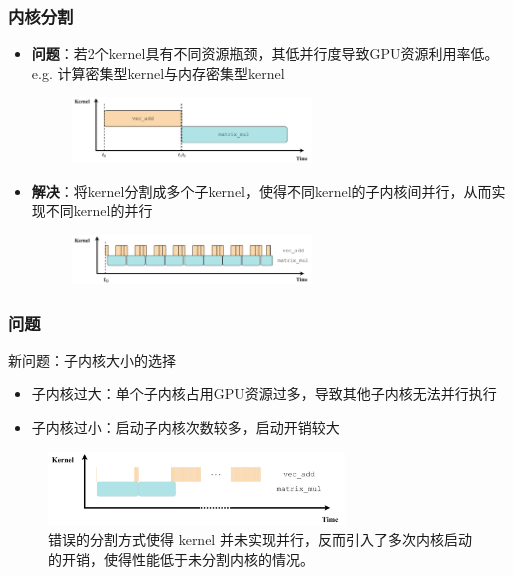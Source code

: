 \documentclass[aspectratio=169]{ctexbeamer}
\begin{document}
\begin{frame}
  \frametitle{内核分割}
  \begin{itemize}
    \item \textbf{问题}：若2个kernel具有不同资源瓶颈，其低并行度导致GPU资源利用率低。\\
    e.g. 计算密集型kernel与内存密集型kernel
    \begin{figure}
      \includegraphics[width=0.6\textwidth]{figures/serial_execution.drawio.pdf}
    \end{figure}
    \item \textbf{解决}：将kernel分割成多个子kernel，使得不同kernel的子内核间并行，从而实现不同kernel的并行
    \begin{figure}
      \includegraphics[width=0.6\textwidth]{figures/opt_cosched.drawio.pdf}
    \end{figure}
  \end{itemize}
\end{frame}

\begin{frame}
  \frametitle{问题}
  {\large{新问题：子内核大小的选择}}
  \begin{itemize}
    \item 子内核过大：单个子内核占用GPU资源过多，导致其他子内核无法并行执行
    \item 子内核过小：启动子内核次数较多，启动开销较大
  \end{itemize}
  \begin{figure}
    \includegraphics[width=0.7\textwidth]{figures/bad_cosched.drawio.pdf}
    \caption{\footnotesize{错误的分割方式使得 kernel 并未实现并行，反而引入了多次内核启动的开销，使得性能低于未分割内核的情况。}}
  \end{figure}
\end{frame}
\end{document}
